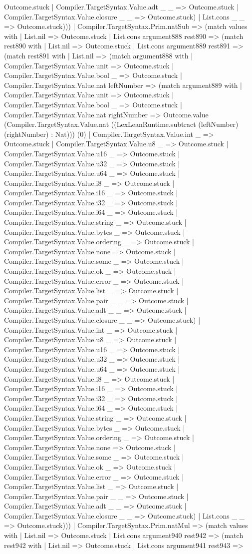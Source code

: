 \documentclass[11pt]{article}
\begin{document}
Outcome.stuck | Compiler.TargetSyntax.Value.adt \_ \_ => Outcome.stuck | Compiler.TargetSyntax.Value.closure \_ \_ => Outcome.stuck) | List.cons \_ \_ => Outcome.stuck))) | Compiler.TargetSyntax.Prim.natSub => (match values with | List.nil => Outcome.stuck | List.cons argument888 rest890 => (match rest890 with | List.nil => Outcome.stuck | List.cons argument889 rest891 => (match rest891 with | List.nil => (match argument888 with | Compiler.TargetSyntax.Value.unit => Outcome.stuck | Compiler.TargetSyntax.Value.bool \_ => Outcome.stuck | Compiler.TargetSyntax.Value.nat leftNumber => (match argument889 with | Compiler.TargetSyntax.Value.unit => Outcome.stuck | Compiler.TargetSyntax.Value.bool \_ => Outcome.stuck | Compiler.TargetSyntax.Value.nat rightNumber => Outcome.value (Compiler.TargetSyntax.Value.nat ((LexLeanRuntime.subtract (leftNumber) (rightNumber) : Nat))) (0) | Compiler.TargetSyntax.Value.int \_ => Outcome.stuck | Compiler.TargetSyntax.Value.u8 \_ => Outcome.stuck | Compiler.TargetSyntax.Value.u16 \_ => Outcome.stuck | Compiler.TargetSyntax.Value.u32 \_ => Outcome.stuck | Compiler.TargetSyntax.Value.u64 \_ => Outcome.stuck | Compiler.TargetSyntax.Value.i8 \_ => Outcome.stuck | Compiler.TargetSyntax.Value.i16 \_ => Outcome.stuck | Compiler.TargetSyntax.Value.i32 \_ => Outcome.stuck | Compiler.TargetSyntax.Value.i64 \_ => Outcome.stuck | Compiler.TargetSyntax.Value.string \_ => Outcome.stuck | Compiler.TargetSyntax.Value.bytes \_ => Outcome.stuck | Compiler.TargetSyntax.Value.ordering \_ => Outcome.stuck | Compiler.TargetSyntax.Value.none => Outcome.stuck | Compiler.TargetSyntax.Value.some \_ => Outcome.stuck | Compiler.TargetSyntax.Value.ok \_ => Outcome.stuck | Compiler.TargetSyntax.Value.error \_ => Outcome.stuck | Compiler.TargetSyntax.Value.list \_ => Outcome.stuck | Compiler.TargetSyntax.Value.pair \_ \_ => Outcome.stuck | Compiler.TargetSyntax.Value.adt \_ \_ => Outcome.stuck | Compiler.TargetSyntax.Value.closure \_ \_ => Outcome.stuck) | Compiler.TargetSyntax.Value.int \_ => Outcome.stuck | Compiler.TargetSyntax.Value.u8 \_ => Outcome.stuck | Compiler.TargetSyntax.Value.u16 \_ => Outcome.stuck | Compiler.TargetSyntax.Value.u32 \_ => Outcome.stuck | Compiler.TargetSyntax.Value.u64 \_ => Outcome.stuck | Compiler.TargetSyntax.Value.i8 \_ => Outcome.stuck | Compiler.TargetSyntax.Value.i16 \_ => Outcome.stuck | Compiler.TargetSyntax.Value.i32 \_ => Outcome.stuck | Compiler.TargetSyntax.Value.i64 \_ => Outcome.stuck | Compiler.TargetSyntax.Value.string \_ => Outcome.stuck | Compiler.TargetSyntax.Value.bytes \_ => Outcome.stuck | Compiler.TargetSyntax.Value.ordering \_ => Outcome.stuck | Compiler.TargetSyntax.Value.none => Outcome.stuck | Compiler.TargetSyntax.Value.some \_ => Outcome.stuck | Compiler.TargetSyntax.Value.ok \_ => Outcome.stuck | Compiler.TargetSyntax.Value.error \_ => Outcome.stuck | Compiler.TargetSyntax.Value.list \_ => Outcome.stuck | Compiler.TargetSyntax.Value.pair \_ \_ => Outcome.stuck | Compiler.TargetSyntax.Value.adt \_ \_ => Outcome.stuck | Compiler.TargetSyntax.Value.closure \_ \_ => Outcome.stuck) | List.cons \_ \_ => Outcome.stuck))) | Compiler.TargetSyntax.Prim.natMul => (match values with | List.nil => Outcome.stuck | List.cons argument940 rest942 => (match rest942 with | List.nil => Outcome.stuck | List.cons argument941 rest943 => 
\end{document}
